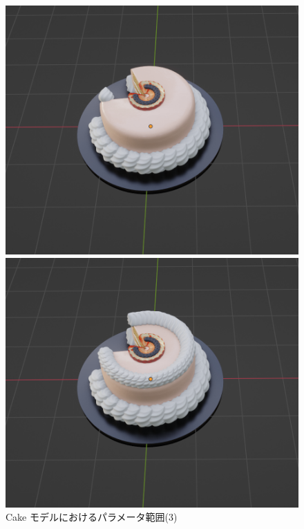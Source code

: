 \begin{figure}[h]
\begin{minipage}[b]{0.48\linewidth}
 \end{minipage}\\
 \begin{minipage}[b]{0.48\linewidth}
  \centering
  \includegraphics[scale=0.25]{./imgs/cakeParamMean/topQuanMin.png}
 \end{minipage}
 \begin{minipage}[b]{0.48\linewidth}
  \centering
  \includegraphics[scale=0.25]{./imgs/cakeParamMean/topQuanMax.png}
 \end{minipage}
 \caption{Cake モデルにおけるパラメータ範囲(3)}\label{fig:cakeParamMean_3}
\end{figure}


